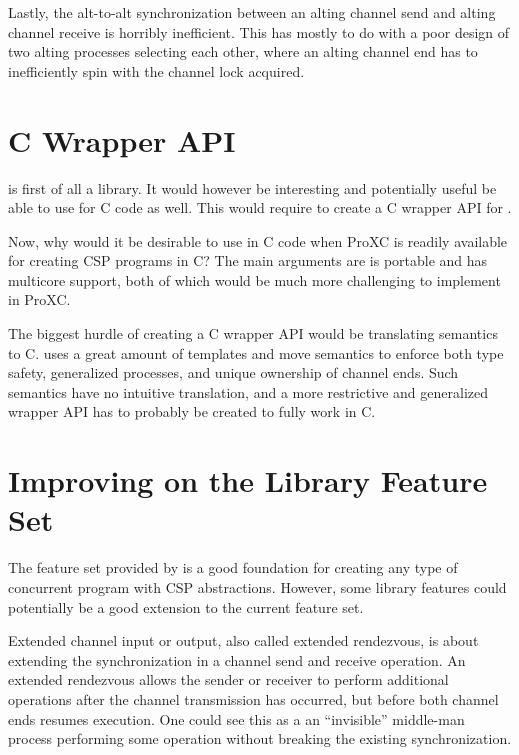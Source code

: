 Lastly, the alt\hyp{}to\hyp{}alt synchronization between an alting channel send and alting channel receive is horribly inefficient. This has mostly to do with a poor design of two alting processes selecting each other, where an alting channel end has to inefficiently spin with the channel lock acquired.


\section{C Wrapper API}


\Proxc{} is first of all a \Cpp{} library. It would however be interesting and potentially useful be able to use \Proxc{} for C code as well. This would require to create a C wrapper API for \Proxc{}.

Now, why would it be desirable to use \Proxc{} in C code when ProXC is readily available for creating CSP programs in C? The main arguments are \Proxc{} is portable and has multicore support, both of which would be much more challenging to implement in ProXC.

The biggest hurdle of creating a C wrapper API would be translating \Cpp{} semantics to C. \Proxc{} uses a great amount of templates and move semantics to enforce both type safety, generalized processes, and unique ownership of channel ends. Such semantics have no intuitive translation, and a more restrictive and generalized wrapper API has to probably be created to fully work in C.


\section{Improving on the Library Feature Set}


The feature set provided by \Proxc{} is a good foundation for creating any type of concurrent program with CSP abstractions. However, some library features could potentially be a good extension to the current feature set.

Extended channel input or output, also called extended rendezvous, is about extending the synchronization in a channel send and receive operation. An extended rendezvous allows the sender or receiver to perform additional operations after the channel transmission has occurred, but before both channel ends resumes execution. One could see this as a an ``invisible'' middle\hyp{}man process performing some operation without breaking the existing synchronization.

